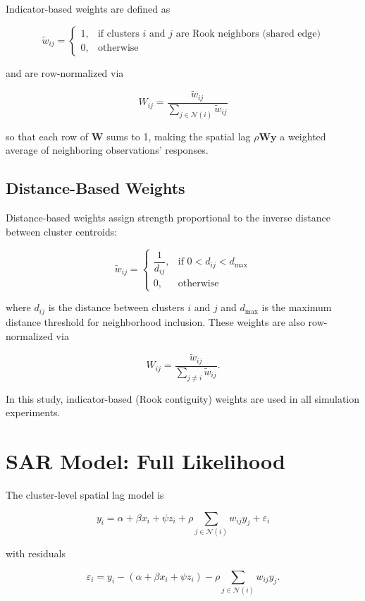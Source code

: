 \documentclass[
  12pt,
  prelim]{bios-prelim}
\begin{document}
Indicator-based weights are defined as

\[
\tilde{w}_{ij} =
\begin{cases}
1, & \text{if clusters $i$ and $j$ are Rook neighbors (shared edge)}\\
0, & \text{otherwise}
\end{cases}
\]

and are row-normalized via

\[
W_{ij} = \frac{\tilde{w}_{ij}}{\displaystyle\sum_{j \in \mathcal{N}(i)} \tilde{w}_{ij}}
\]

so that each row of \(\mathbf{W}\) sums to 1, making the spatial lag
\(\rho\mathbf{Wy}\) a weighted average of neighboring observations'
responses.

\subsection*{Distance-Based Weights}\label{distance-based-weights}

Distance-based weights assign strength proportional to the inverse
distance between cluster centroids:

\[
\tilde{w}_{ij} =
\begin{cases}
\dfrac{1}{d_{ij}}, & \text{if } 0 < d_{ij} < d_{\max}\\[4pt]
0, & \text{otherwise}
\end{cases}
\]

where \(d_{ij}\) is the distance between clusters \(i\) and \(j\) and
\(d_{\max}\) is the maximum distance threshold for neighborhood
inclusion. These weights are also row-normalized via

\[
W_{ij} = \frac{\tilde{w}_{ij}}{\displaystyle\sum_{j \neq i}\tilde{w}_{ij}}.
\]

In this study, indicator-based (Rook contiguity) weights are used in all
simulation experiments.

\section{SAR Model: Full Likelihood}\label{sec-apx-sar}

The cluster-level spatial lag model is

\[
y_i = \alpha + \beta x_i + \psi z_i + \rho \sum_{j \in \mathcal{N}(i)} w_{ij} y_j + \varepsilon_i
\]

with residuals

\[
\varepsilon_i = y_i - \left(\alpha + \beta x_i + \psi z_i\right) - \rho \sum_{j \in \mathcal{N}(i)} w_{ij} y_j.
\]
\end{document}
